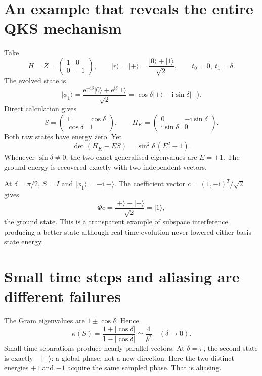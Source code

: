 \documentclass[11pt,a4paper,oneside]{report}
\newcommand{\ket}[1]{\lvert #1\rangle}
\newcommand{\abs}[1]{\left\lvert #1\right\rvert}
\newcommand{\I}{\mathrm i}
\newcommand{\e}{\mathrm e}
\begin{document}
\section{An example that reveals the entire QKS mechanism}
Take
\begin{equation}
H=Z=\begin{pmatrix}1&0\\0&-1\end{pmatrix},\qquad
\ket r=\ket+=\frac{\ket0+\ket1}{\sqrt2},\qquad t_0=0,\ t_1=\delta.
\end{equation}
The evolved state is
\begin{equation}
\ket{\phi_1}=\frac{\e^{-\I\delta}\ket0+\e^{\I\delta}\ket1}{\sqrt2}
=\cos\delta\ket+-\I\sin\delta\ket-.
\end{equation}
Direct calculation gives
\begin{equation}\label{eq:twoS}
S=\begin{pmatrix}1&\cos\delta\\\cos\delta&1\end{pmatrix},\qquad
H_K=\begin{pmatrix}0&-\I\sin\delta\\\I\sin\delta&0\end{pmatrix}.
\end{equation}
Both raw states have energy zero. Yet
\begin{equation}
\det(H_K-ES)=\sin^2\delta\,(E^2-1).
\end{equation}
Whenever $\sin\delta\ne0$, the two exact generalised eigenvalues are $E=\pm1$. The ground energy is recovered exactly with two independent vectors.

At $\delta=\pi/2$, $S=I$ and $\ket{\phi_1}=-\I\ket-$. The coefficient vector $c=(1,-\I)^T/\sqrt2$ gives
\begin{equation}
\Phi c=\frac{\ket+-\ket-}{\sqrt2}=\ket1,
\end{equation}
the ground state. This is a transparent example of subspace interference producing a better state although real-time evolution never lowered either basis-state energy.

\section{Small time steps and aliasing are different failures}
The Gram eigenvalues are $1\pm\cos\delta$. Hence
\begin{equation}
\kappa(S)=\frac{1+\abs{\cos\delta}}{1-\abs{\cos\delta}}
\simeq\frac4{\delta^2}\quad(\delta\rightarrow0).
\end{equation}
Small time separations produce nearly parallel vectors. At $\delta=\pi$, the second state is exactly $-\ket+$: a global phase, not a new direction. Here the two distinct energies $+1$ and $-1$ acquire the same sampled phase. That is aliasing.
\end{document}

